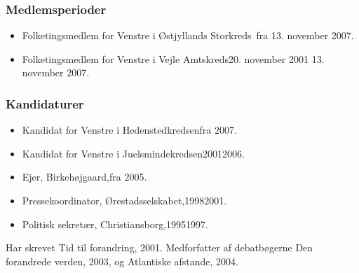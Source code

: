 \documentclass[11pt, a4paper]{awesome-cv}
\begin{document}
\begin{cvletter}
\subsubsection*{Medlemsperioder}
\begin{itemize}
\item Folketingsmedlem for Venstre i Østjyllands Storkreds fra 13. november 2007.
\item Folketingsmedlem for Venstre i Vejle Amtskreds20. november 2001  13. november 2007.
\end{itemize}
\subsubsection*{Kandidaturer}
\begin{itemize}
\item Kandidat for Venstre i Hedenstedkredsenfra 2007.
\item Kandidat for Venstre i Juelsmindekredsen20012006.
\end{itemize}
\begin{itemize}
\item Ejer, Birkehøjgaard,fra 2005.
\item Pressekoordinator, Ørestadsselskabet,19982001.
\item Politisk sekretær, Christiansborg,19951997.
\end{itemize}
Har skrevet Tid til forandring, 2001. Medforfatter af debatbøgerne Den forandrede verden, 2003, og Atlantiske afstande, 2004.

\end{cvletter}
\end{document}
